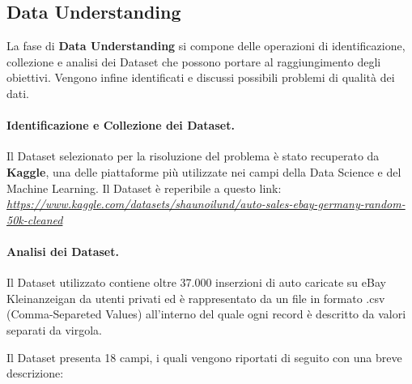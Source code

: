 \subsection{Data Understanding}
La fase di \textbf{Data Understanding} si compone delle operazioni di identificazione, collezione e analisi dei Dataset che possono portare al raggiungimento degli obiettivi. Vengono infine identificati e discussi possibili problemi di qualità dei dati.

\paragraph{Identificazione e Collezione dei Dataset.}
Il Dataset selezionato per la risoluzione del problema è stato recuperato da \textbf{Kaggle}, una delle piattaforme più utilizzate nei campi della Data Science e del Machine Learning. Il Dataset è reperibile a questo link:
\textit{\url{https://www.kaggle.com/datasets/shaunoilund/auto-sales-ebay-germany-random-50k-cleaned}} %

\paragraph{Analisi dei Dataset.}
Il Dataset utilizzato contiene oltre 37.000 inserzioni di auto caricate su eBay Kleinanzeigan da utenti privati ed è rappresentato da un file in formato .csv (Comma-Separeted Values) all'interno del quale ogni record è descritto da valori separati da virgola.

Il Dataset presenta 18 campi, i quali vengono riportati di seguito con una breve descrizione:

